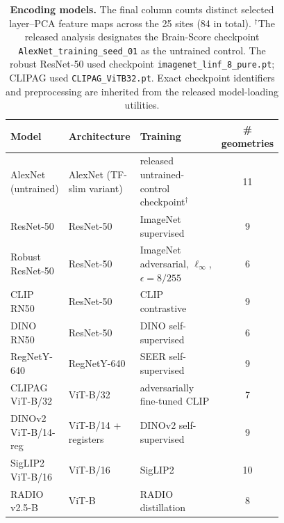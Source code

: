 \begin{table}[ht]
\centering\small
\begin{tabular}{@{}p{0.2\linewidth}p{0.22\linewidth}p{0.36\linewidth}c@{}}
\toprule
Model & Architecture & Training & \# geometries \\
\midrule
AlexNet (untrained) & AlexNet (TF-slim variant) & released untrained-control checkpoint$^\dagger$ & 11\\
ResNet-50 & ResNet-50 & ImageNet supervised & 9\\
Robust ResNet-50 & ResNet-50 & ImageNet adversarial, $\ell_\infty$, $\epsilon=8/255$ & 6\\
CLIP RN50 & ResNet-50 & CLIP contrastive & 9\\
DINO RN50 & ResNet-50 & DINO self-supervised & 6\\
RegNetY-640 & RegNetY-640 & SEER self-supervised & 9\\
CLIPAG ViT-B/32 & ViT-B/32 & adversarially fine-tuned CLIP & 7\\
DINOv2 ViT-B/14-reg & ViT-B/14 + registers & DINOv2 self-supervised & 9\\
SigLIP2 ViT-B/16 & ViT-B/16 & SigLIP2 & 10\\
RADIO v2.5-B & ViT-B & RADIO distillation & 8\\
\bottomrule
\end{tabular}
\caption{\textbf{Encoding models.} The final column counts distinct selected
layer--PCA feature maps across the 25 sites (84 in total). $^\dagger$The
released analysis designates the Brain-Score checkpoint
\texttt{AlexNet\_training\_seed\_01} as the untrained control.  The robust
ResNet-50 used checkpoint \texttt{imagenet\_linf\_8\_pure.pt}; CLIPAG used
\texttt{CLIPAG\_ViTB32.pt}.  Exact checkpoint identifiers and preprocessing
are inherited from the released model-loading utilities.}
\label{tab:app-models}
\end{table}

